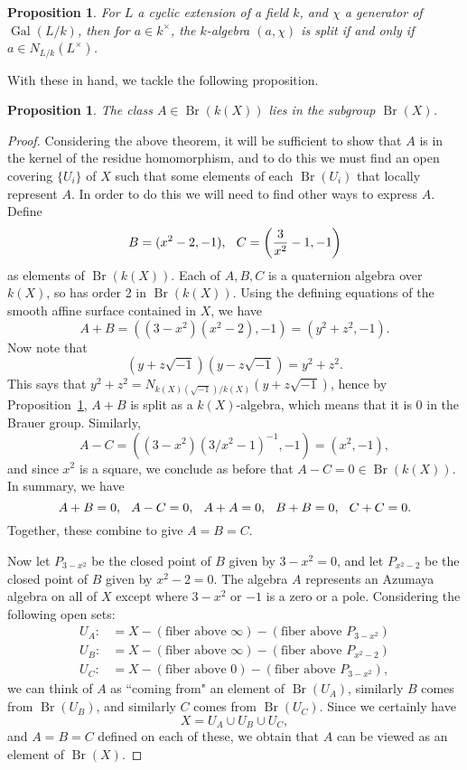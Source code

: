 \documentclass[12pt,twoside]{reedthesis}
\theoremstyle{plain}
\newtheorem{proposition}[theorem]{Proposition}
\theoremstyle{definition}
\theoremstyle{remark}
\newcommand{\Br}{\operatorname{Br}}
\newcommand{\Gal}{\operatorname{Gal}}
\begin{document}
\begin{proposition}\label{splitting}
For $L$ a cyclic extension of a field $k$, and $\chi$ a generator of $\Gal(L/k)$, then for $a\in k^\times$, the $k$-algebra $(a,\chi)$ is split if and only if $a\in N_{L/k}(L^\times)$.
\end{proposition}
\noindent With these in hand, we tackle the following proposition.
\begin{proposition}
The class $A\in\Br(k(X))$ lies in the subgroup $\Br(X)$.
\end{proposition}
\begin{proof}
Considering the above theorem, it will be sufficient to show that $A$ is in the kernel of the residue homomorphism, and to do this we must find an open covering $\{U_i\}$ of $X$ such that some elements of each $\Br(U_i)$ that locally represent $A$. In order to do this we will need to find other ways to express $A$. Define 
\[
B=(x^2-2,-1),\hspace{0.25cm} C=\left(\frac{3}{x^2}-1,-1\right)
\]
as elements of $\Br(k(X))$. Each of $A,B,C$ is a quaternion algebra over $k(X)$, so has order 2 in $\Br(k(X))$. Using the defining equations of the smooth affine surface contained in $X$, we have
\[
A+B=((3-x^2)(x^2-2),-1)=(y^2+z^2,-1).
\]
Now note that
\[
(y+z\sqrt{-1})(y-z\sqrt{-1})=y^2+z^2.
\]
This says that $y^2+z^2=N_{k(X)(\sqrt{-1})/k(X)}(y+z\sqrt{-1})$, hence by Proposition~\ref{splitting}, $A+B$ is split as a $k(X)$-algebra, which means that it is 0 in the Brauer group. Similarly,
\[
A-C=((3-x^2)(3/x^2-1)^{-1},-1)=(x^2,-1),
\]
and since $x^2$ is a square, we conclude as before that $A-C=0\in\Br(k(X)).$ In summary, we have
\[
A+B=0,\hspace{0.25cm} A-C=0,\hspace{0.25cm} A+A=0,\hspace{0.25cm} B+B=0,\hspace{0.25cm} C+C=0.
\]
Together, these combine to give $A=B=C$. 

Now let $P_{3-x^2}$ be the closed point of $B$ given by $3-x^2=0$, and let $P_{x^2-2}$ be the closed point of $B$ given by $x^2-2=0$. The algebra $A$ represents an Azumaya algebra on all of $X$ except where $3-x^2$ or $-1$ is a zero or a pole. Considering the following open sets:
\begin{align*}
U_A:&=X-(\text{fiber above $\infty$})-(\text{fiber above $P_{3-x^2}$})\\
U_B:&=X-(\text{fiber above $\infty$})-(\text{fiber above $P_{x^2-2}$})\\
U_C:&=X-(\text{fiber above $0$})-(\text{fiber above $P_{3-x^2}$}),
\end{align*}
we can think of $A$ as ``coming from" an element of $\Br(U_A)$, similarly $B$ comes from $\Br(U_B)$, and similarly $C$ comes from $\Br(U_C)$. Since we certainly have \[X=U_A\cup U_B\cup U_C,\] and $A=B=C$ defined on each of these, we obtain that $A$ can be viewed as an element of $\Br(X)$.
\end{proof}
\end{document}
